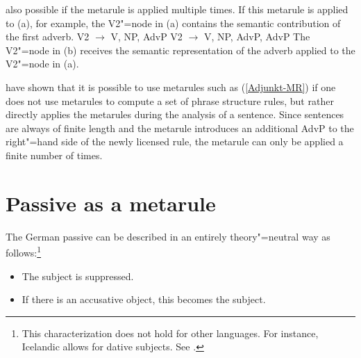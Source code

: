 also possible if the metarule is applied multiple times. If this metarule is applied to (a),
for example, the V2"=node in (a) contains the semantic contribution of the first adverb.
\eal
\ex V2 $\to$ V, NP, AdvP
\ex V2 $\to$ V, NP, AdvP, AdvP
\zl
The V2"=node in (b) receives the semantic representation of the adverb applied to the V2"=node in
(a).

\citet{WP92b} have shown that it is possible to use metarules such as (\ref{Adjunkt-MR}) if one does not use
metarules to compute a set of phrase structure rules, but rather directly applies the metarules
during the analysis of a sentence. Since sentences are always of finite length and the metarule
introduces an additional AdvP to the right"=hand side of the newly licensed rule, the metarule can
only be applied a finite number of times.  

\section{Passive as a metarule}
\label{sec-passive-gpsg}

The German passive can be described in an entirely theory"=neutral way as
follows:\footnote{%
  This characterization does not hold for other languages. For instance, Icelandic allows for dative
  subjects. See \citet*{ZMT85a}.
}
\begin{itemize}
\item The subject is suppressed. 
\item If there is an accusative object, this becomes the subject.
\end{itemize}

